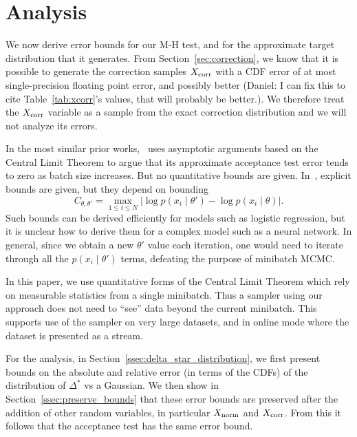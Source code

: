 \documentclass{article}
\begin{document}
\section{Analysis}\label{sec:analysis}

We now derive error bounds for our M-H test, and for the approximate target
distribution that it generates. From Section~\ref{sec:correction}, we know that
it is possible to generate the correction samples $X_{\rm corr}$ with a CDF
error of at most single-precision floating point error, and possibly better
{\color{blue} (Daniel: I can fix this to cite Table~\ref{tab:xcorr}'s values,
that will probably be better.)}. We therefore treat the $X_{\rm corr}$ variable
as a sample from the exact correction distribution and we will not analyze its
errors.

In the most similar prior works,~\cite{cutting_mh_2014} uses asymptotic
arguments based on the Central Limit Theorem to argue that its approximate
acceptance test error tends to zero as batch size increases. But no quantitative
bounds are given. In~\cite{icml2014c1_bardenet14}, explicit bounds are given,
but they depend on bounding
\begin{equation}\label{eq:bad_bound}
    C_{\theta, \theta'} = \max_{1\leq i\leq N}|\log p(x_i\mid\theta') - \log p(x_i\mid\theta)|.
\end{equation}
Such bounds can be derived efficiently for models such as logistic regression,
but it is unclear how to derive them for a complex model such as a neural
network. In general, since we obtain a new $\theta'$ value each iteration, one
would need to iterate through all the $p(x_i\mid \theta')$ terms, defeating the
purpose of minibatch MCMC.

In this paper, we use quantitative forms of the Central Limit Theorem which rely
on measurable statistics from a single minibatch. Thus a sampler using our
approach does not need to ``see'' data beyond the current minibatch. This
supports use of the sampler on very large datasets, and in online mode where the
dataset is presented as a stream.

For the analysis, in Section~\ref{ssec:delta_star_distribution}, we first
present bounds on the absolute and relative error (in terms of the CDFs) of the
distribution of $\Delta^*$ vs a Gaussian. We then show in
Section~\ref{ssec:preserve_bounds} that these error bounds are preserved after
the addition of other random variables, in particular $X_{\rm norm}$ and $X_{\rm
corr}$. From this it follows that the acceptance test has the same error bound.
\end{document}
